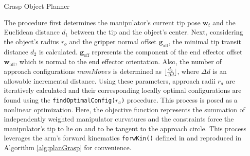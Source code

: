 \begin{algorithm}[!htbp]
\begin{small}
{  \KwRet{$\boldsymbol{\kappa}^*$} \; }
  \setcounter{AlgoLine}{0}
  \caption{Grasp Object Planner}
  \label{alg:planGrasp}
\end{small}

\end{algorithm}

The procedure first determines the manipulator's current tip pose $\mathbf{w}_t$ and the Euclidean distance $d_1$ between the tip and the object's center. 
Next, considering the object's radius $r_o$ and the gripper normal offset $\mathbf{g}_{\textrm{off}}$, the minimal tip transit distance $d_2$ is calculated. 
 $\mathbf{g}_{\textrm{off}}$ represents the component of the end effector offset $\mathbf{w}_{\textrm{off}}$, which is normal to the end effector orientation. 
Also, the number of approach configurations $numMoves$ is determined as $\lfloor \frac{d_2}{\Delta d} \rfloor$, where $\Delta d$ is an allowable incremental distance. 
Using these parameters, approach radii $r_a$ are iteratively calculated and their corresponding locally optimal configurations are found using the \texttt{findOptimalConfig($r_a$)} procedure. 
This process is posed as a nonlinear optimization. 
Here, the objective function represents the summation of independently weighted manipulator curvatures and the constraints force the manipulator's tip to lie on and to be tangent to the approach circle. 
This process leverages the arm's forward kinematics \texttt{forwKin()} defined in \cite{marchese2014design} and reproduced in Algorithm \ref{alg:planGrasp} for convenience. 

